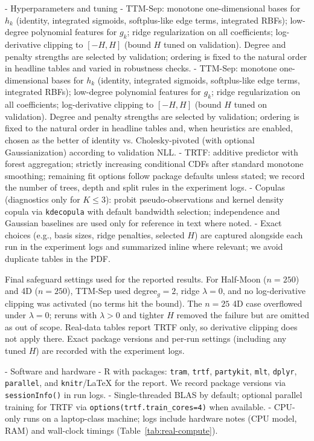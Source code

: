 \documentclass[11pt,a4paper,twoside]{book}\usepackage[]{graphicx}\usepackage[]{xcolor}
\begin{document}
- Hyperparameters and tuning
  - TTM-Sep: monotone one-dimensional bases for $h_k$ (identity, integrated sigmoids, softplus-like edge terms, integrated RBFs); low-degree polynomial features for $g_k$; ridge regularization on all coefficients; log-derivative clipping to $[-H,H]$ (bound $H$ tuned on validation). Degree and penalty strengths are selected by validation; ordering is fixed to the natural order in headline tables and varied in robustness checks.
  - TTM-Sep: monotone one-dimensional bases for $h_k$ (identity, integrated sigmoids, softplus-like edge terms, integrated RBFs); low-degree polynomial features for $g_k$; ridge regularization on all coefficients; log-derivative clipping to $[-H,H]$ (bound $H$ tuned on validation). Degree and penalty strengths are selected by validation; ordering is fixed to the natural order in headline tables and, when heuristics are enabled, chosen as the better of identity vs. Cholesky-pivoted (with optional Gaussianization) according to validation NLL.
  - TRTF: additive predictor with forest aggregation; strictly increasing conditional CDFs after standard monotone smoothing; remaining fit options follow package defaults unless stated; we record the number of trees, depth and split rules in the experiment logs.
  - Copulas (diagnostics only for $K\le 3$): probit pseudo-observations and kernel density copula via \texttt{kdecopula} with default bandwidth selection; independence and Gaussian baselines are used only for reference in text where noted.
  - Exact choices (e.g., basis sizes, ridge penalties, selected $H$) are captured alongside each run in the experiment logs and summarized inline where relevant; we avoid duplicate tables in the PDF.

Final safeguard settings used for the reported results. For Half-Moon ($n=250$) and 4D ($n=250$), TTM-Sep used degree$_g=2$, ridge $\lambda=0$, and no log-derivative clipping was activated (no terms hit the bound). The $n=25$ 4D case overflowed under $\lambda=0$; reruns with $\lambda>0$ and tighter $H$ removed the failure but are omitted as out of scope. Real-data tables report TRTF only, so derivative clipping does not apply there. Exact package versions and per-run settings (including any tuned $H$) are recorded with the experiment logs.

- Software and hardware
  - R with packages: \texttt{tram}, \texttt{trtf}, \texttt{partykit}, \texttt{mlt}, \texttt{dplyr}, \texttt{parallel}, and \texttt{knitr}/LaTeX for the report. We record package versions via \texttt{sessionInfo()} in run logs.
  - Single-threaded BLAS by default; optional parallel training for TRTF via \texttt{options(trtf.train_cores=4)} when available.
  - CPU-only runs on a laptop-class machine; logs include hardware notes (CPU model, RAM) and wall-clock timings (Table~\ref{tab:real-compute}).
\end{document}
